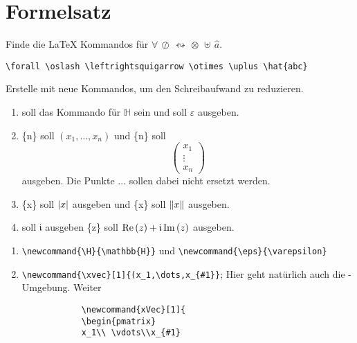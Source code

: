 \section{Formelsatz}
\begin{uebung}

\item Finde die \LaTeX{} Kommandos für $\forall\,\oslash\,\leftrightsquigarrow\,\otimes\,\uplus\,\hat{a}$.
        \begin{loesung}
            \verb|\forall \oslash \leftrightsquigarrow \otimes \uplus \hat{abc}|
        \end{loesung}
\item Erstelle mit  neue Kommandos, um den Schreibaufwand zu reduzieren.
        \begin{enumerate}[label=(\alph*)]
            \item {} soll das Kommando für $\mathbb{H}$ sein und  soll $\varepsilon$ ausgeben.
            \item {}\{n\} soll $(x_1,\dots,x_n)$ und \{n\} soll 
                \[
                    \begin{pmatrix}
                    x_1 \\ \vdots \\ x_n
                    \end{pmatrix}
                \]
                ausgeben. Die Punkte $\dots$ sollen dabei nicht ersetzt werden. 
            \item {}\{x\} soll $\lvert x\rvert$ ausgeben und \{x\} soll $\lVert x\rVert$ ausgeben. 
            \item {} soll $\mathfrak{i}$ ausgeben \{z\} soll $\operatorname{Re}\left(z\right)+\mathfrak{i}\operatorname{Im}\left(z\right)$ ausgeben.
        \end{enumerate}
        \begin{loesung}
            \begin{enumerate}[label=(\alph*)]
            \item \verb|\newcommand{\H}{\mathbb{H}}| und \verb|\newcommand{\eps}{\varepsilon}|
            \item \verb|\newcommand{\xvec}[1]{(x_1,\dots,x_{#1}}|; Hier geht natürlich auch die -Umgebung. Weiter \\
            \begin{verbatim}
            \newcommand{xVec}[1]{
            \begin{pmatrix}
            x_1\\ \vdots\\x_{#1}

\end{verbatim}
\end{enumerate}
\end{loesung}
\end{uebung}
